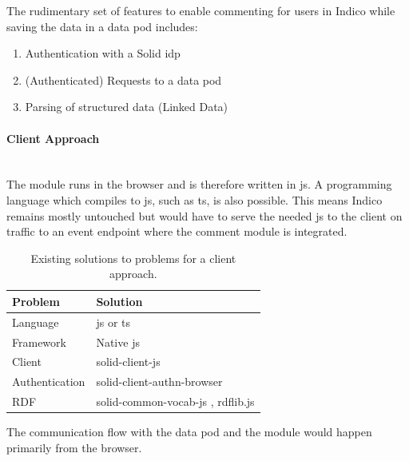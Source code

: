 The rudimentary set of features to enable commenting for users in Indico while saving the data in a data pod includes: 

\begin{enumerate}
    \item Authentication with a Solid \gls{idp}
    \item (Authenticated) Requests to a data pod
    \item Parsing of structured data (Linked Data)
\end{enumerate}
\vspace{0.5cm}
\paragraph{Client Approach}\mbox{}\\

The module runs in the browser and is therefore written in \gls{js}. A programming language which compiles to \gls{js}, such as \gls{ts}, is also possible. This means Indico remains mostly untouched but would have to serve the needed \gls{js} to the client on traffic to an event endpoint where the comment module is integrated.

\begin{table}[h!]
    \centering
    \begin{tabular}{| l | l |} 
     \hline
     Problem & Solution \\
     \hline
      Language & \gls{js} or \gls{ts}  \\
      Framework & Native \gls{js}  \\
      Client & solid-client-js \cite{solid-client-js}  \\
      Authentication & solid-client-authn-browser \cite{solid-client-authn-browser} \\
      RDF & solid-common-vocab-js \cite{solid-common-vocab-js}, rdflib.js \cite{rdflib.js}  \\
     \hline
    \end{tabular}
    \vspace{0.75cm}
    \caption{Existing solutions to problems for a client approach.}
    \label{table:1}
\end{table}

The communication flow with the data pod and the module would happen primarily from the browser.

